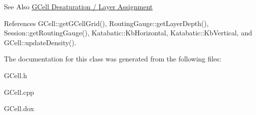 \begin{DoxySeeAlso}{See Also}
\hyperlink{classKatabatic_1_1GCell_secGCellDesaturation}{G\-Cell Desaturation / Layer Assignment} 
\end{DoxySeeAlso}


References G\-Cell\-::get\-G\-Cell\-Grid(), Routing\-Gauge\-::get\-Layer\-Depth(), Session\-::get\-Routing\-Gauge(), Katabatic\-::\-Kb\-Horizontal, Katabatic\-::\-Kb\-Vertical, and G\-Cell\-::update\-Density().



The documentation for this class was generated from the following files\-:\begin{DoxyCompactItemize}
\item 
G\-Cell.\-h\item 
G\-Cell.\-cpp\item 
G\-Cell.\-dox\end{DoxyCompactItemize}
